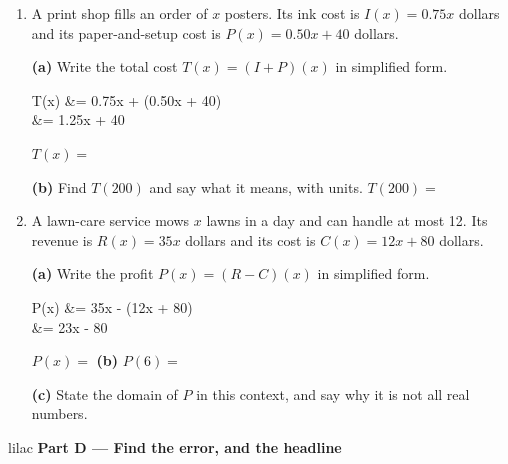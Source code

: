 \documentclass[10pt]{article}
\begin{document}
\begin{enumerate}[leftmargin=1.9em, itemsep=8pt, start=6]

\item A print shop fills an order of $x$ posters. Its ink cost is $I(x) = 0.75x$ dollars and its
      paper-and-setup cost is $P(x) = 0.50x + 40$ dollars.

      \textbf{(a)} Write the total cost $T(x) = (I + P)(x)$ in simplified form.

\begin{work}
  T(x) &= 0.75x + (0.50x + 40) \\
       &= 1.25x + 40
\end{work}

      $T(x) = $ 

      \textbf{(b)} Find $T(200)$ and say what it means, with units. \quad $T(200) = $ 

\item A lawn-care service mows $x$ lawns in a day and can handle at most 12. Its revenue is
      $R(x) = 35x$ dollars and its cost is $C(x) = 12x + 80$ dollars.

      \textbf{(a)} Write the profit $P(x) = (R - C)(x)$ in simplified form.

\begin{work}
  P(x) &= 35x - (12x + 80) \\
       &= 23x - 80
\end{work}

      $P(x) = $  \qquad \textbf{(b)} $P(6) = $ 

      \textbf{(c)} State the domain of $P$ in this context, and say why it is not all real numbers.

\end{enumerate}

\vspace{0.1in}

\begin{headlinebox}{lilac}
\textbf{\color{plum}Part D --- Find the error, and the headline}
\end{headlinebox}
\end{document}
